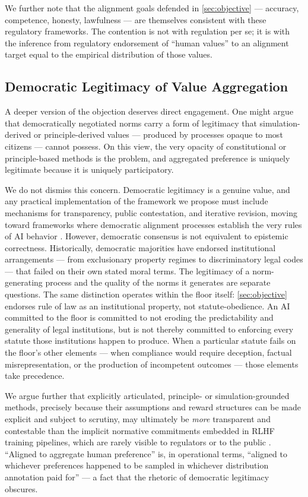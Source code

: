 \documentclass{article}
\theoremstyle{plain}
\theoremstyle{definition}
\theoremstyle{remark}
\begin{document}
We further note that the alignment goals defended in \cref{sec:objective} --- accuracy, competence, honesty, lawfulness --- are themselves consistent with these regulatory frameworks. The contention is not with regulation per se; it is with the inference from regulatory endorsement of ``human values'' to an alignment target equal to the empirical distribution of those values.

\subsection{Democratic Legitimacy of Value Aggregation}
\label{sec:alt-democratic}
A deeper version of the objection deserves direct engagement. One might argue that democratically negotiated norms carry a form of legitimacy that simulation-derived or principle-derived values --- produced by processes opaque to most citizens --- cannot possess. On this view, the very opacity of constitutional or principle-based methods is the problem, and aggregated preference is uniquely legitimate because it is uniquely participatory.

We do not dismiss this concern. Democratic legitimacy is a genuine value, and any practical implementation of the framework we propose must include mechanisms for transparency, public contestation, and iterative revision, moving toward frameworks where democratic alignment processes establish the very rules of AI behavior \citep{conitzer2024social, zhang2025democratic}. However, democratic consensus is not equivalent to epistemic correctness. Historically, democratic majorities have endorsed institutional arrangements --- from exclusionary property regimes to discriminatory legal codes --- that failed on their own stated moral terms. The legitimacy of a norm-generating process and the quality of the norms it generates are separate questions. The same distinction operates within the floor itself: \cref{sec:objective} endorses rule of law as an institutional property, not statute-obedience. An AI committed to the floor is committed to not eroding the predictability and generality of legal institutions, but is not thereby committed to enforcing every statute those institutions happen to produce. When a particular statute fails on the floor's other elements --- when compliance would require deception, factual misrepresentation, or the production of incompetent outcomes --- those elements take precedence.

We argue further that explicitly articulated, principle- or simulation-grounded methods, precisely because their assumptions and reward structures can be made explicit and subject to scrutiny, may ultimately be \emph{more} transparent and contestable than the implicit normative commitments embedded in RLHF training pipelines, which are rarely visible to regulators or to the public \citep{bender2021stochastic}. ``Aligned to aggregate human preference'' is, in operational terms, ``aligned to whichever preferences happened to be sampled in whichever distribution annotation paid for'' --- a fact that the rhetoric of democratic legitimacy obscures.
\end{document}
